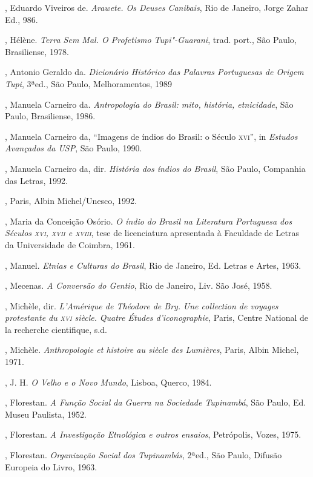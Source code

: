 \begin{bibliohedra}
, Eduardo Viveiros de. \textit{Arawete. Os Deuses Canibais}, Rio
de Janeiro, Jorge Zahar Ed., 986.

, Hélène. \textit{Terra Sem Mal. O Profetismo Tupi"-Guarani}, 
trad. port., São Paulo, Brasiliense, 1978.

, Antonio Geraldo da. \textit{Dicionário Histórico das Palavras
Portuguesas de Origem Tupi}, 3ªed., São Paulo, Melhoramentos, 1989

, Manuela Carneiro da. \textit{Antropologia do Brasil: mito,
história, etnicidade}, São Paulo, Brasiliense, 1986.

, Manuela Carneiro da, ``Imagens de índios do Brasil: o Século
\textsc{xvi}'', in \textit{Estudos Avançados da USP}, São Paulo, 1990.

, Manuela Carneiro da, dir. \textit{História dos índios do
Brasil}, São Paulo, Companhia das Letras, 1992.

, Paris, Albin Michel/Unesco, 1992. 

, Maria da Conceição Osório. \textit{O índio do Brasil na
Literatura Portuguesa dos Séculos \textsc{xvi}, \textsc{xvii} e \textsc{xviii}}, tese de
licenciatura apresentada à Faculdade de Letras da Universidade de Coimbra, 1961.

, Manuel. \textit{Etnias e Culturas do Brasil}, Rio de
Janeiro, Ed. Letras e Artes, 1963.

, Mecenas. \textit{A Conversão do Gentio}, Rio de Janeiro, Liv.
São José, 1958.

, Michèle, dir. \textit{L'Amérique de Théodore de Bry.}
\textit{Une collection de voyages protestante du \textsc{xvi} siècle.}
\textit{Quatre Études d'iconographie}, Paris, Centre National de la
recherche cientifique, s.d.

, Michèle. \textit{Anthropologie et histoire au siècle des
Lumières}, Paris, Albin Michel, 1971.

, J. H. \textit{O Velho e o Novo Mundo}, Lisboa, Querco, 1984. 

, Florestan. \textit{A Função Social da Guerra na Sociedade
Tupinambá}, São Paulo, Ed. Museu Paulista, 1952.

, Florestan. \textit{A Investigação Etnológica e outros
ensaios}, Petrópolis, Vozes, 1975.

, Florestan. \textit{Organização Social dos Tupinambás}, 
2ªed., São Paulo, Difusão Europeia do Livro, 1963.


\end{bibliohedra}
